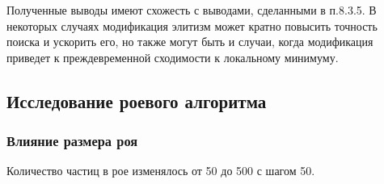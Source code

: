 \documentclass[12pt,a4paper]{article}
\begin{document}
\begin{table}[H]
    \centering
    \caption{Исследование влияния элитизма.}
    \label{tab:elitism}
\end{table}

Полученные выводы имеют схожесть с выводами, сделанными в п.8.3.5. В некоторых случаях модификация элитизм может кратно повысить точность поиска и ускорить его, но также могут быть и случаи, когда модификация приведет к преждевременной сходимости к локальному минимуму.

\subsection{Исследование роевого алгоритма}

\subsubsection{Влияние размера роя}
Количество частиц в рое изменялось от 50 до 500 с шагом 50.
\end{document}
